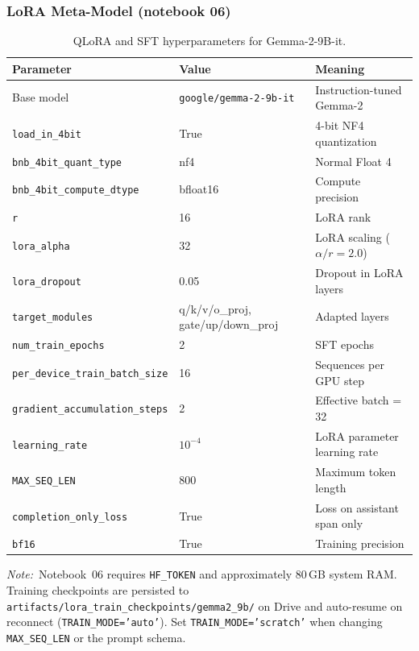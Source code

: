 \documentclass[11pt,a4paper]{article}
\newcommand{\repo}[1]{\texttt{#1}}
\newcommand{\note}[1]{\textit{Note:}~#1}
\begin{document}
\subsubsection{LoRA Meta-Model (notebook 06)}
\begin{table}[htbp]
  \centering
  \caption{QLoRA and SFT hyperparameters for Gemma-2-9B-it.}
  \label{tab:lora-hparams}
  \small
  \begin{tabular}{@{}lll@{}}
    \toprule
    Parameter & Value & Meaning \\
    \midrule
    Base model & \texttt{google/gemma-2-9b-it} & Instruction-tuned Gemma-2 \\
    \texttt{load\_in\_4bit} & True & 4-bit NF4 quantization \\
    \texttt{bnb\_4bit\_quant\_type} & nf4 & Normal Float 4 \\
    \texttt{bnb\_4bit\_compute\_dtype} & bfloat16 & Compute precision \\
    \texttt{r} & 16 & LoRA rank \\
    \texttt{lora\_alpha} & 32 & LoRA scaling ($\alpha/r = 2.0$) \\
    \texttt{lora\_dropout} & 0.05 & Dropout in LoRA layers \\
    \texttt{target\_modules} & q/k/v/o\_proj, gate/up/down\_proj & Adapted layers \\
    \texttt{num\_train\_epochs} & 2 & SFT epochs \\
    \texttt{per\_device\_train\_batch\_size} & 16 & Sequences per GPU step \\
    \texttt{gradient\_accumulation\_steps} & 2 & Effective batch = 32 \\
    \texttt{learning\_rate} & $10^{-4}$ & LoRA parameter learning rate \\
    \texttt{MAX\_SEQ\_LEN} & 800 & Maximum token length \\
    \texttt{completion\_only\_loss} & True & Loss on assistant span only \\
    \texttt{bf16} & True & Training precision \\
    \bottomrule
  \end{tabular}
\end{table}

\note{Notebook~06 requires \texttt{HF\_TOKEN} and approximately 80\,GB system RAM. Training checkpoints are persisted to \repo{artifacts/lora\_train\_checkpoints/gemma2\_9b/} on Drive and auto-resume on reconnect (\texttt{TRAIN\_MODE='auto'}). Set \texttt{TRAIN\_MODE='scratch'} when changing \texttt{MAX\_SEQ\_LEN} or the prompt schema.}
\end{document}
